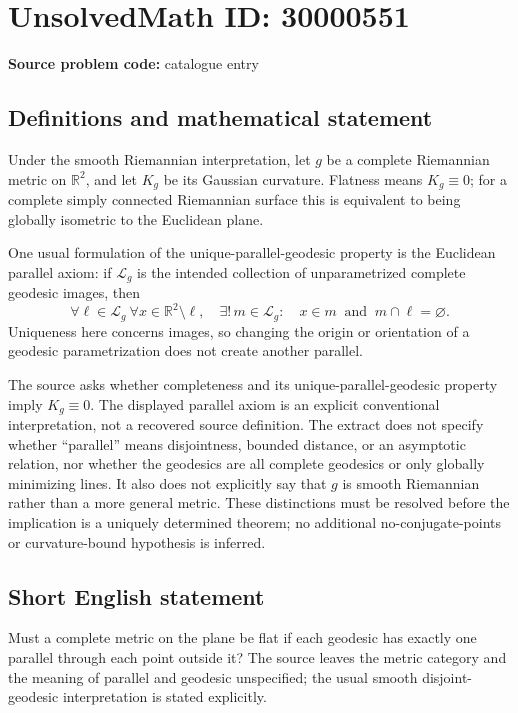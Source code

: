 \documentclass[11pt]{article}
\newcommand{\R}{\mathbb{R}}
\begin{document}
\section*{UnsolvedMath ID: 30000551}
\textbf{Source problem code:} catalogue entry
\subsection{Definitions and mathematical statement}
Under the smooth Riemannian interpretation, let $g$ be a complete Riemannian metric on $\R^2$, and let $K_g$ be its Gaussian curvature. Flatness means $K_g\equiv0$; for a complete simply connected Riemannian surface this is equivalent to being globally isometric to the Euclidean plane.

One usual formulation of the unique-parallel-geodesic property is the Euclidean parallel axiom: if $\mathcal L_g$ is the intended collection of unparametrized complete geodesic images, then
\[
\forall\ell\in\mathcal L_g\ \forall x\in\R^2\setminus\ell,
\quad\exists!\,m\in\mathcal L_g:
\quad x\in m\ \text{ and }\ m\cap\ell=\varnothing.
\]
Uniqueness here concerns images, so changing the origin or orientation of a geodesic parametrization does not create another parallel.

The source asks whether completeness and its unique-parallel-geodesic property imply $K_g\equiv0$. The displayed parallel axiom is an explicit conventional interpretation, not a recovered source definition. The extract does not specify whether ``parallel'' means disjointness, bounded distance, or an asymptotic relation, nor whether the geodesics are all complete geodesics or only globally minimizing lines. It also does not explicitly say that $g$ is smooth Riemannian rather than a more general metric. These distinctions must be resolved before the implication is a uniquely determined theorem; no additional no-conjugate-points or curvature-bound hypothesis is inferred.
\subsection{Short English statement}
Must a complete metric on the plane be flat if each geodesic has exactly one parallel through each point outside it? The source leaves the metric category and the meaning of parallel and geodesic unspecified; the usual smooth disjoint-geodesic interpretation is stated explicitly.
\end{document}
